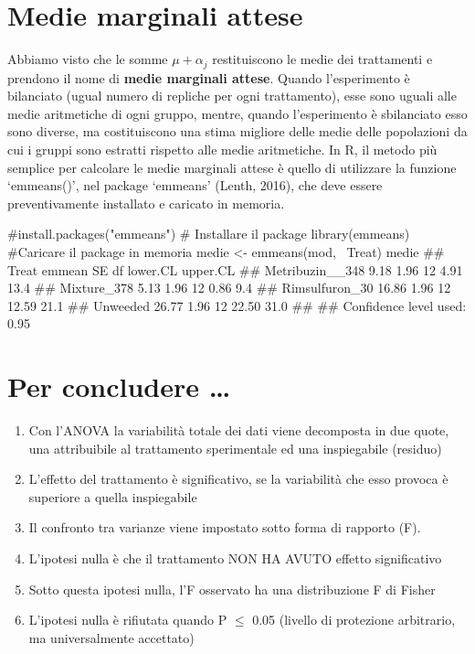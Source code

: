 \documentclass[a4paper,12pt,oneside]{book}
\providecommand{\tightlist}{%
  \setlength{\itemsep}{0pt}\setlength{\parskip}{0pt}}
\newenvironment{Shaded}{}{}
\newcommand{\KeywordTok}[1]{#1}
\newcommand{\StringTok}[1]{#1}
\newcommand{\CommentTok}[1]{#1}
\newcommand{\OperatorTok}[1]{#1}
\newcommand{\NormalTok}[1]{#1}
\begin{document}
\hypertarget{medie-marginali-attese}{%
\section{Medie marginali attese}\label{medie-marginali-attese}}

Abbiamo visto che le somme \(\mu + \alpha_j\) restituiscono le medie dei trattamenti e prendono il nome di \textbf{medie marginali attese}. Quando l'esperimento è bilanciato (ugual numero di repliche per ogni trattamento), esse sono uguali alle medie aritmetiche di ogni gruppo, mentre, quando l'esperimento è sbilanciato esso sono diverse, ma costituiscono una stima migliore delle medie delle popolazioni da cui i gruppi sono estratti rispetto alle medie aritmetiche. In R, il metodo più semplice per calcolare le medie marginali attese è quello di utilizzare la funzione `emmeans()', nel package `emmeans' (Lenth, 2016), che deve essere preventivamente installato e caricato in memoria.

\begin{Shaded}
\begin{Highlighting}[]
\CommentTok{#install.packages("emmeans") # Installare il package}
\KeywordTok{library}\NormalTok{(emmeans) }\CommentTok{#Caricare il package in memoria}
\NormalTok{medie <-}\StringTok{ }\KeywordTok{emmeans}\NormalTok{(mod, }\OperatorTok{~}\NormalTok{Treat)}
\NormalTok{medie}
\CommentTok{##  Treat           emmean   SE df lower.CL upper.CL}
\CommentTok{##  Metribuzin__348   9.18 1.96 12     4.91     13.4}
\CommentTok{##  Mixture_378       5.13 1.96 12     0.86      9.4}
\CommentTok{##  Rimsulfuron_30   16.86 1.96 12    12.59     21.1}
\CommentTok{##  Unweeded         26.77 1.96 12    22.50     31.0}
\CommentTok{## }
\CommentTok{## Confidence level used: 0.95}
\end{Highlighting}
\end{Shaded}

\hypertarget{per-concludere}{%
\section{Per concludere \ldots{}}\label{per-concludere}}

\begin{enumerate}
\def\labelenumi{\arabic{enumi}.}
\tightlist
\item
  Con l'ANOVA la variabilità totale dei dati viene decomposta in due quote, una attribuibile al trattamento sperimentale ed una inspiegabile (residuo)
\item
  L'effetto del trattamento è significativo, se la variabilità che esso provoca è superiore a quella inspiegabile
\item
  Il confronto tra varianze viene impostato sotto forma di rapporto (F).
\item
  L'ipotesi nulla è che il trattamento NON HA AVUTO effetto significativo
\item
  Sotto questa ipotesi nulla, l'F osservato ha una distribuzione F di Fisher
\item
  L'ipotesi nulla è rifiutata quando P \(\leq\) 0.05 (livello di protezione arbitrario, ma universalmente accettato)
\end{enumerate}
\end{document}
